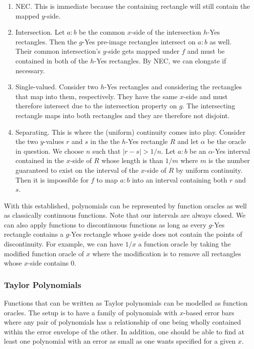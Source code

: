 \documentclass[12pt]{article}
\theoremstyle{remark}
\begin{document}
\begin{enumerate} 
\item NEC. This is immediate because the containing rectangle will still contain the mapped $y$-side. 
\item Intersection. Let $a:b$ be the common $x$-side of the intersection $h$-Yes rectangles. Then the $g$-Yes pre-image rectangles intersect on $a:b$ as well. Their common intersection's $y$-side gets mapped under $f$ and must be contained in both of the $h$-Yes rectangles. By NEC, we can elongate if necessary. 
\item Single-valued. Consider two $h$-Yes rectangles and considering the rectangles that map into them, respectively. They have the same $x$-side and must therefore intersect due to the intersection property on $g$. The intersecting rectangle maps into both rectangles and they are therefore not disjoint.  
\item Separating. This is where the (uniform) continuity comes into play.  Consider the two $y$-values $r$ and $s$ in the the $h$-Yes rectangle $R$ and let $\alpha$ be the oracle in question. We choose $n$ such that $|r-s| > 1/n$. Let $a:b$ be an $\alpha$-Yes interval contained in the $x$-side of $R$ whose length is than $1/m$ where $m$ is the number guaranteed to exist on the interval of the $x$-side of $R$ by uniform continuity. Then it is impossible for $f$ to map $a:b$ into an interval containing both $r$ and $s$.
\end{enumerate}

With this established, polynomials can be represented by function oracles as well as classically continuous functions. Note that our intervals are always closed. We can also apply functions to discontinuous functions as long as every $g$-Yes rectangle contains a $g$-Yes rectangle whose $y$-side does not contain the points of discontinuity. For example, we can have $1/x$ a function oracle by taking the modified function oracle of $x$ where the modification is to remove all rectangles whose $x$-side contains 0. 


\subsubsection{Taylor Polynomials}

Functions that can be written as Taylor polynomials can be modelled as function oracles. The setup is to have a family of polynomials with $x$-based error bars where any pair of polynomials has a relationship of one being wholly contained within the error envelope of the other. In addition, one should be able to find at least one polynomial with an error as small as one wants specified for a given $x$. 
\end{document}
